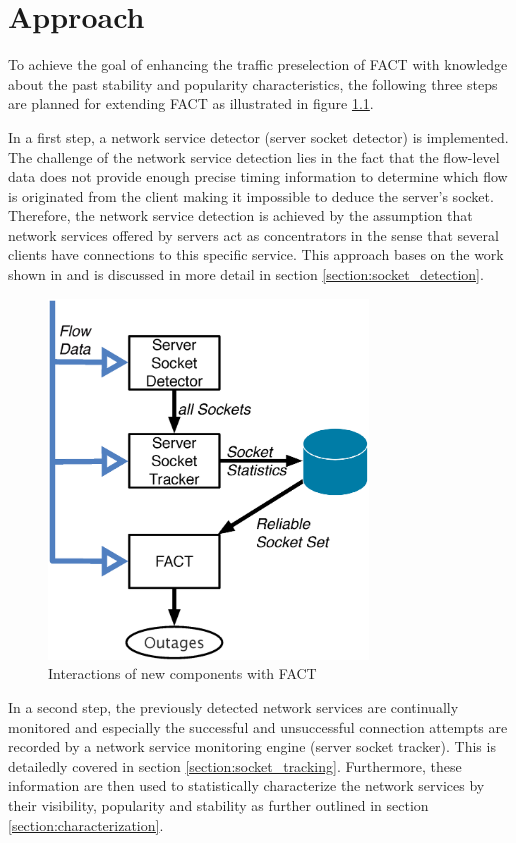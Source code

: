 \chapter{Approach
\label{chapter:approach}}

To achieve the goal of enhancing the traffic preselection of \gls{FACT} with knowledge about the past stability and popularity characteristics, the following three steps are planned for extending \gls{FACT} as illustrated in figure  \ref{fig:FACT}.

In a first step, a network service detector (server socket detector) is  implemented. 
The challenge of the network service detection lies in the fact  that the flow-level data does not provide enough precise timing information to  determine which flow is originated from the client making it impossible to deduce the server's socket\citep{Schatzmann:Tracing}. 
Therefore, the network service detection is achieved by the assumption that network services offered by servers act as concentrators in the sense that several clients have connections to this specific service. 
This approach bases on the work shown in \cite{Schatzmann:Dissection, Schatzmann:Mining, Schatzmann:Tracing} and is discussed in more detail in section \ref{section:socket_detection}.

\begin{figure}
	[t] \centering
	\includegraphics[width=8.5cm]{images/Approach_blockdiagram.eps}
	\caption{Interactions of new components with \gls{FACT}} 
	\label{fig:FACT} 
\end{figure}

In a second step, the previously detected network services are continually monitored and especially the successful and unsuccessful connection attempts are recorded by a network service monitoring engine (server socket tracker). This is detailedly covered in section \ref{section:socket_tracking}.
Furthermore, these information are then used to statistically characterize the network services by their visibility, popularity and stability as further outlined in section \ref{section:characterization}.

